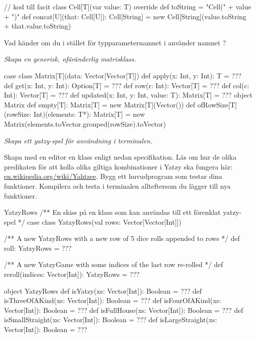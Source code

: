 \begin{Code}
// kod till facit
class Cell[T](var value: T){
  override def toString = "Cell(" + value + ")"
  def concat[U](that: Cell[U]): Cell[String] = 
    new Cell[String](value.toString + that.value.toString)
}
\end{Code}

\Subtask\Pen Vad händer om du i stället för typparameternamnet  i  använder namnet ?

\Task \emph{Skapa en generisk, ofäränderlig matrisklass.}

\begin{Code}
case class Matrix[T](data: Vector[Vector[T]]) {
  def apply(x: Int, y: Int): T = ???
  def get(x: Int, y: Int): Option[T] = ???
  def row(r: Int): Vector[T] = ???
  def col(c: Int): Vector[T] = ???
  def updated(x: Int, y: Int, value: T): Matrix[T] = ???
}
object Matrix {
  def empty[T]: Matrix[T] = new Matrix[T](Vector())
  def ofRowSize[T](rowSize: Int)(elements: T*): Matrix[T] =
    new Matrix(elements.toVector.grouped(rowSize).toVector)
}
\end{Code}

\Subtask 

\ExtraTasks %

\Task \emph{Skapa ett yatzy-spel för användning i terminalen.}

\Subtask Skapa med en editor en klass enligt nedan specifikation. Läs om hur de olika predikaten för att kolla olika giltiga kombinationer i Yatzy ska fungera här: \href{https://en.wikipedia.org/wiki/Yahtzee}{en.wikipedia.org/wiki/Yahtzee}. Bygg ett huvudprogram som testar dina funktioner. Kompilera och testa i terminalen allteftersom du lägger till nya funktioner.

\begin{ScalaSpec}{YatzyRows}
/** En skiss på en klass som kan användas till ett förenklat yatzy-spel */
case class YatzyRows(val rows: Vector[Vector[Int]]) {
  /** A new YatzyRows with a new row of 5 dice rolls appended to rows  */
  def roll: YatzyRows = ???

  /** A new YatzyGame with some indices of the last row re-rolled  */
  def reroll(indices: Vector[Int]): YatzyRows = ???
}

object YatzyRows {
  def isYatzy(xs: Vector[Int]): Boolean = ???
  def isThreeOfAKind(xs: Vector[Int]): Boolean = ???
  def isFourOfAKind(xs: Vector[Int]): Boolean = ???
  def isFullHouse(xs: Vector[Int]): Boolean = ???
  def isSmallStraight(xs: Vector[Int]): Boolean = ???
  def isLargeStraight(xs: Vector[Int]): Boolean = ???
}
\end{ScalaSpec}


